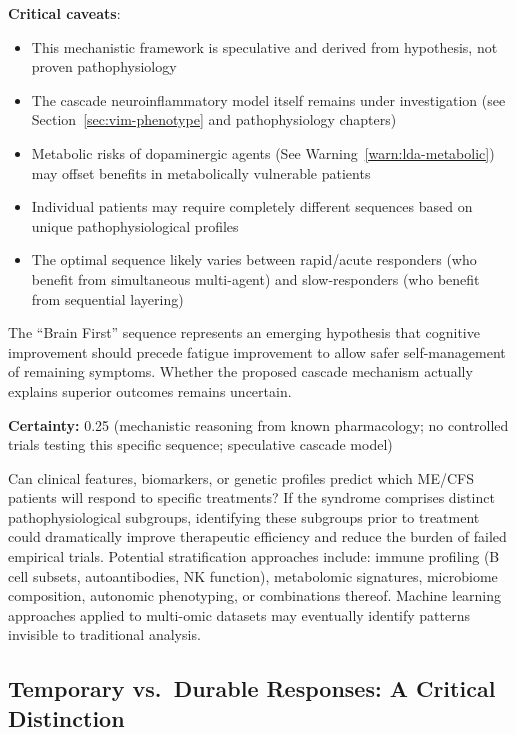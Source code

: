 \begin{hypothesis}
\textbf{Critical caveats}:
\begin{itemize}
    \item This mechanistic framework is speculative and derived from hypothesis, not proven pathophysiology
    \item The cascade neuroinflammatory model itself remains under investigation (see Section~\ref{sec:vim-phenotype} and pathophysiology chapters)
    \item Metabolic risks of dopaminergic agents (See Warning~\ref{warn:lda-metabolic}) may offset benefits in metabolically vulnerable patients
    \item Individual patients may require completely different sequences based on unique pathophysiological profiles
    \item The optimal sequence likely varies between rapid/acute responders (who benefit from simultaneous multi-agent) and slow-responders (who benefit from sequential layering)
\end{itemize}

The ``Brain First'' sequence represents an emerging hypothesis that cognitive improvement should precede fatigue improvement to allow safer self-management of remaining symptoms. Whether the proposed cascade mechanism actually explains superior outcomes remains uncertain.

\textbf{Certainty:} 0.25 (mechanistic reasoning from known pharmacology; no controlled trials testing this specific sequence; speculative cascade model)
\end{hypothesis}

\begin{open_question}
Can clinical features, biomarkers, or genetic profiles predict which ME/CFS patients will respond to specific treatments? If the syndrome comprises distinct pathophysiological subgroups, identifying these subgroups prior to treatment could dramatically improve therapeutic efficiency and reduce the burden of failed empirical trials. Potential stratification approaches include: immune profiling (B cell subsets, autoantibodies, NK function), metabolomic signatures, microbiome composition, autonomic phenotyping, or combinations thereof. Machine learning approaches applied to multi-omic datasets may eventually identify patterns invisible to traditional analysis.
\end{open_question}

\subsection{Temporary vs.\ Durable Responses: A Critical Distinction}
\label{sec:temporary-durable}

